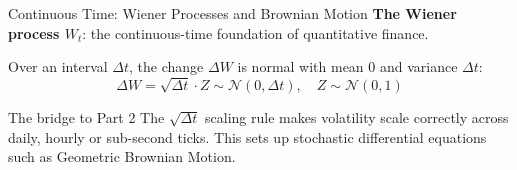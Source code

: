 \documentclass[aspectratio=169,11pt]{beamer}
\begin{document}
\begin{frame}{Continuous Time: Wiener Processes and Brownian Motion}
  \textbf{The Wiener process $W_t$}: the continuous-time foundation of quantitative finance.
  \bigskip

  Over an interval $\Delta t$, the change $\Delta W$ is normal with mean 0 and variance $\Delta t$:
  \[
    \Delta W = \sqrt{\Delta t} \cdot Z \sim \mathcal{N}(0, \Delta t), \quad Z \sim \mathcal{N}(0, 1)
  \]

  \begin{alertblock}{The bridge to Part 2}
    The $\sqrt{\Delta t}$ scaling rule makes volatility scale correctly across daily, hourly or sub-second ticks. This sets up stochastic differential equations such as Geometric Brownian Motion.
  \end{alertblock}
\end{frame}
\end{document}
